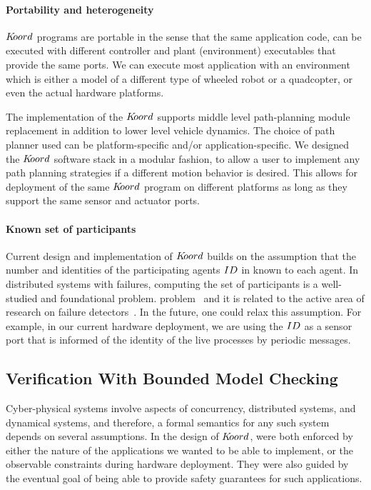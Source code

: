 \paragraph*{Portability and heterogeneity}

$K\kern-2pt oord$ programs are portable in the sense that the same application code, can be executed with different controller and plant (environment) executables that provide the same ports. We can execute most application with an environment which is either a model of a different type of wheeled robot or a quadcopter, or even the actual hardware platforms. 

The implementation of the $K\kern-2pt oord$ supports middle level path-planning module replacement in addition to lower level vehicle dynamics. The  choice of path planner  used  can  be  platform-specific  and/or  application-specific. We designed the $K\kern-2pt oord$ software stack in a modular fashion, to allow a user to implement any path planning strategies if a different motion behavior is desired. This allows for deployment of the same $K\kern-2pt oord$ program on different platforms as long as they support the same sensor and actuator ports. 

\paragraph*{Known set of participants}
Current design and implementation of $K\kern-2pt oord$ builds on the assumption that the number and identities of the participating agents $ID$ in known to each agent. In distributed systems with failures, computing the set of participants is a well-studied and foundational problem. problem~\cite{AlistarhAGG2011} and it is related to the active area of research on failure detectors~\cite{Chandra:1996,delporte2004weakest}. In the future, one could  relax this  assumption. For example, in our current hardware deployment, we are using the $ID$ as a sensor port that is informed of the identity of the live processes by periodic messages. 

\subsection{Verification With Bounded Model Checking}
Cyber-physical systems involve aspects of concurrency, distributed systems, and dynamical systems, and therefore, a formal semantics for any such system depends on several assumptions. In the design of $K\kern-2pt oord$, were both enforced by either the nature of the applications we wanted to be able to implement, or the observable constraints during hardware deployment. They were also guided by the eventual goal of being able to provide safety guarantees for such applications.


